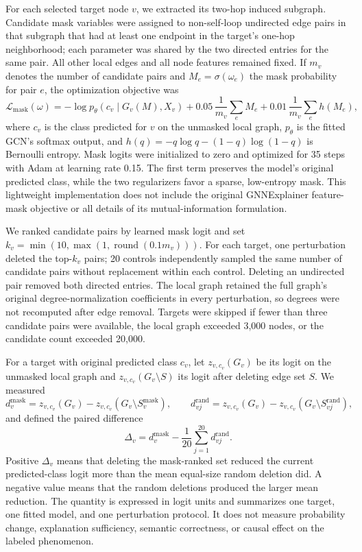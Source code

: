 \documentclass[11pt,a4paper]{article}
\begin{document}
For each selected target node $v$, we extracted its two-hop induced subgraph. Candidate mask variables were assigned to non-self-loop undirected edge pairs in that subgraph that had at least one endpoint in the target's one-hop neighborhood; each parameter was shared by the two directed entries for the same pair. All other local edges and all node features remained fixed. If $m_v$ denotes the number of candidate pairs and $M_e=\sigma(\omega_e)$ the mask probability for pair $e$, the optimization objective was
\begin{equation}
  \mathcal{L}_{\mathrm{mask}}(\omega)=-\log p_{\theta}(c_v\mid G_v(M),X_v)
  +0.05\,\frac{1}{m_v}\sum_e M_e
  +0.01\,\frac{1}{m_v}\sum_e h(M_e),
\end{equation}
where $c_v$ is the class predicted for $v$ on the unmasked local graph, $p_{\theta}$ is the fitted GCN's softmax output, and $h(q)=-q\log q-(1-q)\log(1-q)$ is Bernoulli entropy. Mask logits were initialized to zero and optimized for 35 steps with Adam at learning rate 0.15. The first term preserves the model's original predicted class, while the two regularizers favor a sparse, low-entropy mask. This lightweight implementation does not include the original GNNExplainer feature-mask objective or all details of its mutual-information formulation.

We ranked candidate pairs by learned mask logit and set $k_v=\min(10,\max(1,\operatorname{round}(0.1m_v)))$. For each target, one perturbation deleted the top-$k_v$ pairs; 20 controls independently sampled the same number of candidate pairs without replacement within each control. Deleting an undirected pair removed both directed entries. The local graph retained the full graph's original degree-normalization coefficients in every perturbation, so degrees were not recomputed after edge removal. Targets were skipped if fewer than three candidate pairs were available, the local graph exceeded 3,000 nodes, or the candidate count exceeded 20,000.

For a target with original predicted class $c_v$, let $z_{v,c_v}(G_v)$ be its logit on the unmasked local graph and $z_{v,c_v}(G_v\setminus S)$ its logit after deleting edge set $S$. We measured
\begin{equation}
  d^{\mathrm{mask}}_v=z_{v,c_v}(G_v)-z_{v,c_v}(G_v\setminus S^{\mathrm{mask}}_v),\qquad
  d^{\mathrm{rand}}_{vj}=z_{v,c_v}(G_v)-z_{v,c_v}(G_v\setminus S^{\mathrm{rand}}_{vj}),
\end{equation}
and defined the paired difference
\begin{equation}
  \Delta_v=d^{\mathrm{mask}}_v-\frac{1}{20}\sum_{j=1}^{20}d^{\mathrm{rand}}_{vj}.
\end{equation}
Positive $\Delta_v$ means that deleting the mask-ranked set reduced the current predicted-class logit more than the mean equal-size random deletion did. A negative value means that the random deletions produced the larger mean reduction. The quantity is expressed in logit units and summarizes one target, one fitted model, and one perturbation protocol. It does not measure probability change, explanation sufficiency, semantic correctness, or causal effect on the labeled phenomenon.
\end{document}
